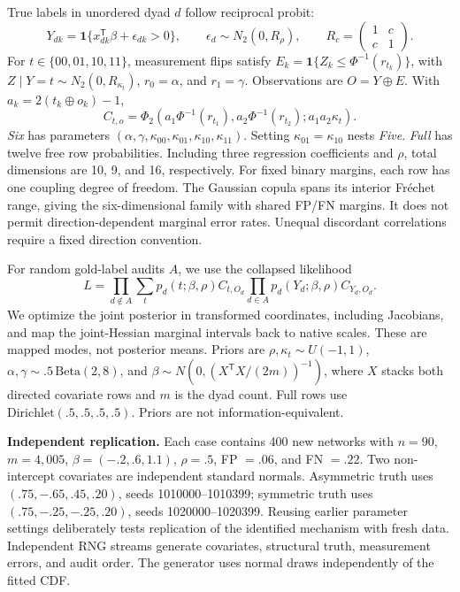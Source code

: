\documentclass[10pt]{article}
\begin{document}
True labels in unordered dyad $d$ follow reciprocal probit:
\[
Y_{dk}=\mathbf1\{x_{dk}^{\mathsf T}\beta+\epsilon_{dk}>0\},\qquad
\epsilon_d\sim N_2(0,R_\rho),\qquad R_c=\begin{pmatrix}1&c\\c&1\end{pmatrix}.
\]
For $t\in\{00,01,10,11\}$, measurement flips satisfy $E_k=\mathbf1\{Z_k\leq\Phi^{-1}(r_{t_k})\}$, with $Z\mid Y=t\sim N_2(0,R_{\kappa_t})$, $r_0=\alpha$, and $r_1=\gamma$. Observations are $O=Y\oplus E$. With $a_k=2(t_k\oplus o_k)-1$,
\begin{equation}
C_{t,o}=\Phi_2\!\left(a_1\Phi^{-1}(r_{t_1}),a_2\Phi^{-1}(r_{t_2});a_1a_2\kappa_t\right).
\end{equation}
\emph{Six} has parameters $(\alpha,\gamma,\kappa_{00},\kappa_{01},\kappa_{10},\kappa_{11})$. Setting $\kappa_{01}=\kappa_{10}$ nests \emph{Five}. \emph{Full} has twelve free row probabilities. Including three regression coefficients and $\rho$, total dimensions are 10, 9, and 16, respectively. For fixed binary margins, each row has one coupling degree of freedom. The Gaussian copula spans its interior Fr\'echet range, giving the six-dimensional family with shared FP/FN margins. It does not permit direction-dependent marginal error rates. Unequal discordant correlations require a fixed direction convention.

For random gold-label audits $A$, we use the collapsed likelihood
\[
L=\prod_{d\notin A}\sum_t p_d(t;\beta,\rho)C_{t,O_d}\prod_{d\in A}p_d(Y_d;\beta,\rho)C_{Y_d,O_d}.
\]
We optimize the joint posterior in transformed coordinates, including Jacobians, and map the joint-Hessian marginal intervals back to native scales. These are mapped modes, not posterior means. Priors are $\rho,\kappa_t\sim U(-1,1)$, $\alpha,\gamma\sim .5\,\mathrm{Beta}(2,8)$, and $\beta\sim N(0,(X^{\mathsf T}X/(2m))^{-1})$, where $X$ stacks both directed covariate rows and $m$ is the dyad count. Full rows use $\mathrm{Dirichlet}(.5,.5,.5,.5)$. Priors are not information-equivalent.

\textbf{Independent replication.} Each case contains 400 new networks with $n=90$, $m=4{,}005$, $\beta=(-.2,.6,1.1)$, $\rho=.5$, FP $=.06$, and FN $=.22$. Two non-intercept covariates are independent standard normals. Asymmetric truth uses $(.75,-.65,.45,.20)$, seeds 1010000--1010399; symmetric truth uses $(.75,-.25,-.25,.20)$, seeds 1020000--1020399. Reusing earlier parameter settings deliberately tests replication of the identified mechanism with fresh data. Independent RNG streams generate covariates, structural truth, measurement errors, and audit order. The generator uses normal draws independently of the fitted CDF.
\end{document}
